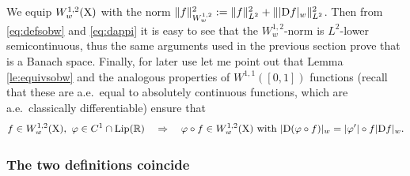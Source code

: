 \documentclass[11pt]{article}
\numberwithin{equation}{section}
\newcommand{\R}{\mathbb{R}}
\newcommand{\X}{{\rm X}}
\newcommand{\D}{{\rm D}}
\newcommand{\Lip}{{\rm Lip}}
\begin{document}
We equip $W^{1,2}_w(\X)$  with the norm $\|f\|_{W^{1,2}_w}^2:=\|f\|_{L^2}^2+\||\D f|_w\|_{L^2}^2$. Then from \eqref{eq:defsobw} and \eqref{eq:dappi} it is easy to see that the $W^{1,2}_w$-norm is $L^2$-lower semicontinuous, thus the same arguments used in the previous section prove that  is a Banach space. Finally, for later use let me point out that Lemma  \ref{le:equivsobw} and the analogous properties of $W^{1,1}([0,1])$ functions (recall that these are a.e.\ equal to absolutely continuous functions, which are a.e.\ classically differentiable) ensure that 
\begin{equation}
\label{eq:chainweak}
f\in W^{1,2}_w(\X),\ \varphi\in C^1\cap \Lip(\R)\quad\Rightarrow\quad  \varphi\circ f\in  W^{1,2}_w(\X)\text{ with }|\D(\varphi\circ f)|_w=|\varphi'|\circ f|\D f|_w.
\end{equation}

\subsubsection{The two definitions coincide}
\end{document}
